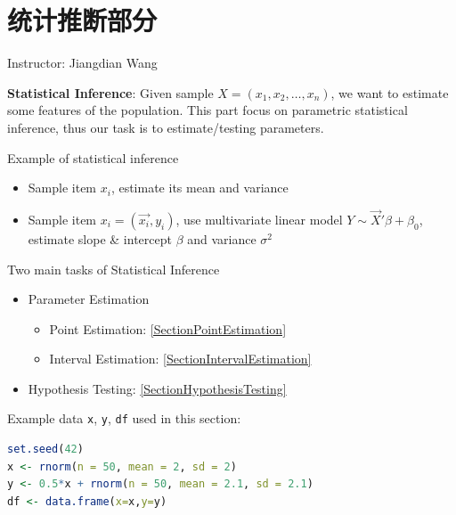 \section{统计推断部分}
\begin{center}
    Instructor: Jiangdian Wang
\end{center}

    \textbf{Statistical Inference}: Given sample $ X=(x_{1},x_{2},\ldots,x_{n})  $, we want to estimate some features of the population. This part focus on parametric statistical inference, thus our task is to estimate/testing parameters.

\begin{point}
    Example of statistical inference
\end{point}

\begin{itemize}[topsep=2pt,itemsep=0pt]
    \item Sample item $ x_i $, estimate its mean and variance
    \item Sample item $ x_i=(\vec{x_i},y_i) $, use multivariate linear model $ Y\sim \vec{X}'\beta +\beta _0 $, estimate slope \& intercept $ \beta  $ and variance $ \sigma ^2 $
\end{itemize}

        
\begin{point}
    Two main tasks of Statistical Inference
\end{point}

    \begin{itemize}[topsep= 2 pt,itemsep= 0 pt,parsep= 0 pt]
        \item Parameter Estimation
        \begin{itemize}
            \item Point Estimation: {\autoref{SectionPointEstimation}}
            \item Interval Estimation: {\autoref{SectionIntervalEstimation}}
        \end{itemize}
        \item Hypothesis Testing: {\autoref{SectionHypothesisTesting}}
    \end{itemize}

\begin{rcode}
    Example data \lstinline|x|, \lstinline|y|, \lstinline|df| used in this section:
\begin{lstlisting}[language=R]
set.seed(42)
x <- rnorm(n = 50, mean = 2, sd = 2)
y <- 0.5*x + rnorm(n = 50, mean = 2.1, sd = 2.1)
df <- data.frame(x=x,y=y)
\end{lstlisting}
\end{rcode}



